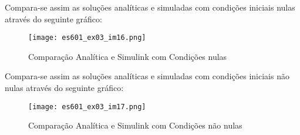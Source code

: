 \documentclass{article}
\begin{document}
\begin{resolution}
\begin{scriptsize}
                    \end{scriptsize}
                Compara-se assim as soluções analíticas e simuladas com condições iniciais nulas através do seguinte gráfico:
                    \begin{figure}[H]
                        \centering
                        \texttt{[image: es601\_ex03\_im16.png]}
                        \caption{Comparação Analítica e Simulink com Condições nulas}
                    \end{figure}
                Compara-se assim as soluções analíticas e simuladas com condições iniciais não nulas através do seguinte gráfico:
                    \begin{figure}[H]
                        \centering
                        \texttt{[image: es601\_ex03\_im17.png]}
                        \caption{Comparação Analítica e Simulink com Condições não nulas}
                    \end{figure}
            \end{resolution}
\end{document}
